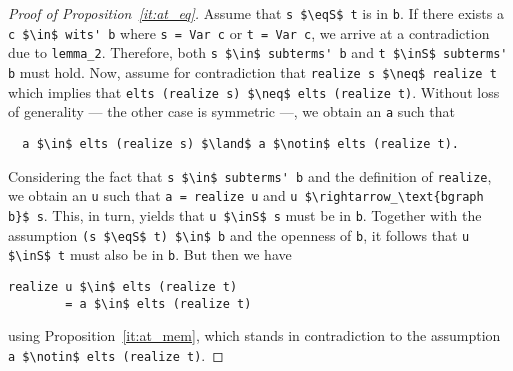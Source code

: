 \documentclass[sigplan,10pt,anonymous,review]{acmart}
\newcommand{\inS}{\in_\text{s}}
\newcommand{\eqS}{=_\text{s}}
\begin{document}
\begin{proof}[Proof of Proposition~\ref{it:at_eq}]
  Assume that \lstinline!s $\eqS$ t! is in \lstinline!b!.
  If there exists a \lstinline!c $\in$ wits' b! where \lstinline!s = Var c! or \lstinline!t = Var c!, we arrive at a contradiction due to \lstinline!lemma_2!.
  Therefore, both \lstinline!s $\in$ subterms' b! and \lstinline!t $\inS$ subterms' b! must hold.
  Now, assume for contradiction that \lstinline!realize s $\neq$ realize t! which implies that \lstinline!elts (realize s) $\neq$ elts (realize t)!.
  Without loss of generality --- the other case is symmetric ---, we obtain an \lstinline!a! such that
\begin{lstlisting}
  a $\in$ elts (realize s) $\land$ a $\notin$ elts (realize t). 
\end{lstlisting}
  Considering the fact that \lstinline!s $\in$ subterms' b! and the definition of \lstinline!realize!, we obtain an \lstinline!u! such that \lstinline!a = realize u! and \lstinline!u $\rightarrow_\text{bgraph b}$ s!.
  This, in turn, yields that \lstinline!u $\inS$ s! must be in \lstinline!b!.
  Together with the assumption \lstinline!(s $\eqS$ t) $\in$ b! and the openness of \lstinline!b!, it follows that \lstinline!u $\inS$ t! must also be in \lstinline!b!.
  But then we have
\begin{lstlisting}[columns=fixed]
  realize u $\in$ elts (realize t)
        = a $\in$ elts (realize t)
\end{lstlisting}
  using Proposition~\ref{it:at_mem}, which stands in contradiction to the assumption \lstinline!a $\notin$ elts (realize t)!.
\end{proof}
\end{document}
